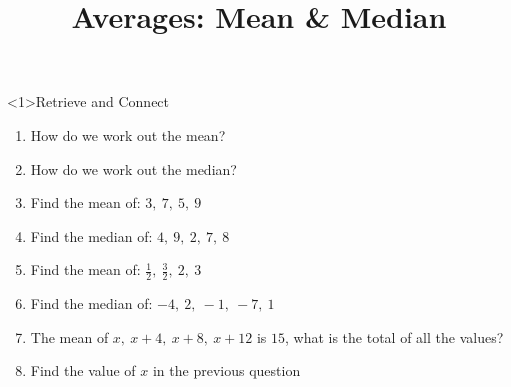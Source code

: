 \documentclass{beamer}
\title{Averages: Mean \& Median}
\author{}
\date{}
\newcommand{\ashow}[1]{\uncover<2->{\textcolor{red}{\small #1}}}
\newcommand{\ashowq}[1]{\alt<2->{\textcolor{red}{\small #1}}{?}}
\begin{document}
\begin{frame}<1>{Retrieve and Connect}
\vspace{-0.8em}

\footnotesize
\begin{enumerate}\itemsep2pt
  \item How do we work out the mean? \ashow{Add the values and divide by how many there are.}
  \item How do we work out the median? \ashow{Order the data and find the middle value.}
  \item Find the mean of: $3,\ 7,\ 5,\ 9$ \ashow{$=6$}
  \item Find the median of: $4,\ 9,\ 2,\ 7,\ 8$ \ashow{$=7$}
  \item Find the mean of: $\frac{1}{2},\ \frac{3}{2},\ 2,\ 3$ \ashow{$=\frac{7}{4}$}
  \item Find the median of: $-4,\ 2,\ -1,\ -7,\ 1$ \ashow{$=-1$}
  \item The mean of $x,\ x+4,\ x+8,\ x+12$ is $15$, what is the total of all the values? \ashow{$60$}
  \item Find the value of $x$ in the previous question \ashow{$x=9$}
\end{enumerate}

\end{frame}
\end{document}
